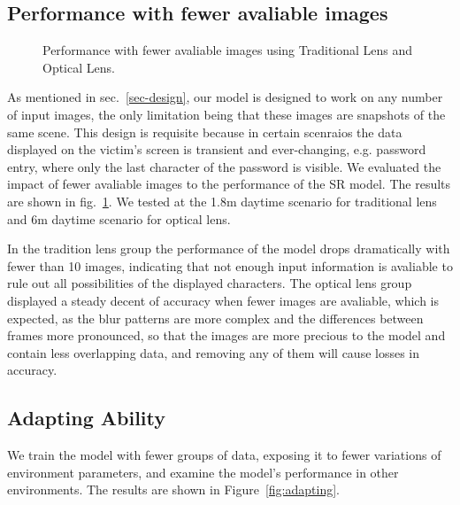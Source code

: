 \subsection{Performance with fewer avaliable images}
\begin{figure}[!t]
    \centering
    \hfill
    \caption{Performance with fewer avaliable images using Traditional Lens and Optical Lens.}
    \label{fig:number}
\end{figure}
As mentioned in sec.~\ref{sec-design}, our model is designed to work on any number of input images, the only limitation being that these images are snapshots of the same scene. This design is requisite because in certain scenraios the data displayed on the victim's screen is transient and ever-changing, e.g. password entry, where only the last character of the password is visible. We evaluated the impact of fewer avaliable images to the performance of the SR model. The results are shown in fig.~\ref{fig:number}. We tested at the 1.8m daytime scenario for traditional lens and 6m daytime scenario for optical lens.

In the tradition lens group the performance of the model drops dramatically with fewer than 10 images, indicating that not enough input information is avaliable to rule out all possibilities of the displayed characters. The optical lens group displayed a steady decent of accuracy when fewer images are avaliable, which is expected, as the blur patterns are more complex and the differences between frames more pronounced, so that the images are more precious to the model and contain less overlapping data, and removing any of them will cause losses in accuracy.

\subsection{Adapting Ability}
We train the model with fewer groups of data, exposing it to fewer variations of environment parameters, and examine the model's performance in other environments. The results are shown in Figure~\ref{fig:adapting}.


